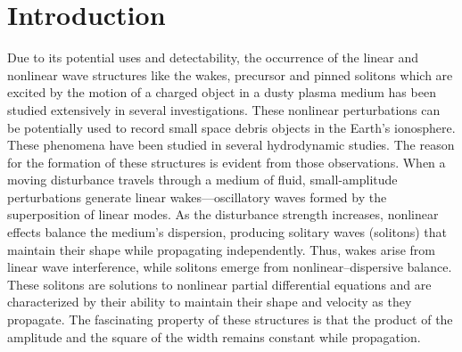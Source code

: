 \documentclass[%
 aip,
 amsmath,amssymb,
 reprint,%
]{revtex4-1}
\begin{document}
\maketitle

%

\section{\label{sec:introduction}Introduction}

Due to its potential uses and detectability, the occurrence of the linear and nonlinear wave structures like the wakes, precursor and pinned solitons which are excited by the motion of a charged object in a dusty plasma medium has been studied extensively in several investigations\cite{r1,r2,r3,r4,r5,r6,r7,r8,r9,r10,r11,r12}. These nonlinear perturbations can be potentially used to record small space debris objects in the Earth's ionosphere. These phenomena have been studied in several hydrodynamic \cite{r13,r14,r15,r16} studies. The reason for the formation of these structures is evident from those observations. When a moving disturbance travels through a medium of fluid, small-amplitude perturbations generate linear wakes—oscillatory waves formed by the superposition of linear modes. As the disturbance strength increases, nonlinear effects balance the medium’s dispersion, producing solitary waves (solitons) that maintain their shape while propagating independently. Thus, wakes arise from linear wave interference, while solitons emerge from nonlinear–dispersive balance.  These solitons are solutions to nonlinear partial differential equations and are characterized by their ability to maintain their shape and velocity as they propagate. The fascinating property of these structures is that the product of the amplitude and the square of the width remains constant while propagation.\\
\end{document}
